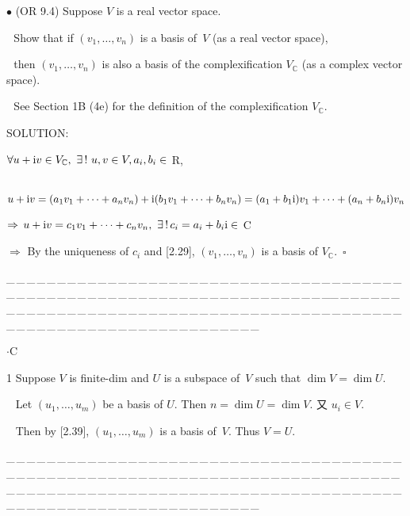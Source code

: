 \documentclass[a4paper, 11pt, UTF8]{article}
\def\i{\textup{i}}
\begin{document}
\begin{large}
{\small $\bullet$} ({\normalsize O{\small R} 9.4}) {\timessl\Large 
Suppose $V$ is a real vector space.}\par\,\,
{\timessl\Large Show that if $(v_1,\dots,v_n)$ is a basis of \,$V$ (as a real vector space),}\par\,\,
{\timessl\Large then $(v_1,\dots,v_n)$ is also a basis of the complexification $V_{\mathbb{C}}$ (as a complex vector space).}\par\,\,
{\timessl\small See Section 1B (4e) for the definition of the complexification $V_{\mathbb{C}}$.
}\par
{\timesbf S\footnotesize{OLUTION:}}\par\quad
$\forall u+\i v\in V_{\mathbb{C}},\,\,\exists\,!\,\,u,v\in V,a_i,b_i\in$ {\timesbf R},\par\quad\,
$u+\i v=(a_1 v_1+\dots+a_n v_n)+\i(b_1 v_1+\dots+b_n v_n)=(a_1+b_1\i)v_1+\dots+(a_n+b_n\i)v_n$\par
$\Rightarrow\,u+\i v=c_1 v_1+\dots+c_n v_n,\,\,\exists\,!\,c_i=a_i+b_i\i\in$ {\timesbf C}\par
$\Rightarrow$ By the uniqueness of $c_i$ and [2.29], $(v_1,\dots,v_n)$ is a basis of $V_{\mathbb{C}}.\,\,\,\square$\par
{\tiny \_\,\_\,\_\,\_\,\_\,\_\,\_\,\_\,\_\,\_\,\_\,\_\,\_\,\_\,\_\,\_\,\_\,\_\,\_\,\_\,\_\,\_\,\_\,\_\,\_\,\_\,\_\,\_\,\_\,\_\,\_\,\_\,\_\,\_\,\_\,\_\,\_\,\_\,\_\,\_\,\_\,\_\,\_\,\_\,\_\,\_\,\_\,\_\,\_\,\_\,\_\,\_\,\_\,\_\,\_\,\_\,\_\,\_\,\_\,\_\,\_\,\_\,\_\,\_\,\_\,\_\,\_\,\_\,\_\,\_\,\_\_\,\_\,\_\,\_\,\_\,\_\,\_\,\_\,\_\,\_\,\_\,\_\,\_\,\_\,\_\,\_\,\_\,\_\,\_\,\_\,\_\,\_\,\_\,\_\,\_\,\_\,\_\,\_\,\_\,\_\,\_\,\_\,\_\,\_\,\_\,\_\,\_\,\_\,\_\,\_\,\_\,\_\,\_\,\_\,\_\,\_\,\_\,\_\,\_\,\_\,\_\,\_\,\_\,\_\,\_\,\_\,\_\,\_\,\_\,\_\,\_\,\_\,\_\,\_\,\_\,\_\,\_\,\_\,\_\,\_\,\_}\par
{}\par
{\huge{}$\cdot$C} %

{\timesbf\Large 1} {\timessl\Large 
Suppose $V$ is finite-dim and $U$ is a subspace of \,$V$ such that $\dim V=\dim U$.}\par\,\,\,
Let $(u_1,\dots,u_m)$ be a basis of $U$. Then $n=\dim U=\dim V.$ 又 $u_i\in V$.\par\,\,\,
Then by [2.39], $(u_1,\dots,u_m)$ is a basis of \,$V$. Thus $V=U$.\par
{\tiny \_\,\_\,\_\,\_\,\_\,\_\,\_\,\_\,\_\,\_\,\_\,\_\,\_\,\_\,\_\,\_\,\_\,\_\,\_\,\_\,\_\,\_\,\_\,\_\,\_\,\_\,\_\,\_\,\_\,\_\,\_\,\_\,\_\,\_\,\_\,\_\,\_\,\_\,\_\,\_\,\_\,\_\,\_\,\_\,\_\,\_\,\_\,\_\,\_\,\_\,\_\,\_\,\_\,\_\,\_\,\_\,\_\,\_\,\_\,\_\,\_\,\_\,\_\,\_\,\_\,\_\,\_\,\_\,\_\,\_\,\_\_\,\_\,\_\,\_\,\_\,\_\,\_\,\_\,\_\,\_\,\_\,\_\,\_\,\_\,\_\,\_\,\_\,\_\,\_\,\_\,\_\,\_\,\_\,\_\,\_\,\_\,\_\,\_\,\_\,\_\,\_\,\_\,\_\,\_\,\_\,\_\,\_\,\_\,\_\,\_\,\_\,\_\,\_\,\_\,\_\,\_\,\_\,\_\,\_\,\_\,\_\,\_\,\_\,\_\,\_\,\_\,\_\,\_\,\_\,\_\,\_\,\_\,\_\,\_\,\_\,\_\,\_\,\_\,\_\,\_\,\_}\par


\end{large}
\end{document}
